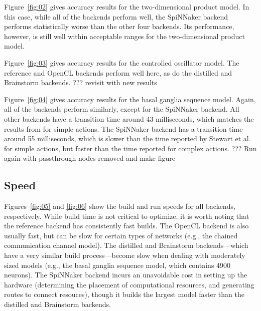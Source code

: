 \documentclass{frontiersSCNS}
\begin{document}
Figure~\ref{fig:02} gives accuracy results
for the two-dimensional product model.
In this case, while all of the backends
perform well, the SpiNNaker backend
performs statistically worse than the
other four backends.
Its performance, however, is still well within
acceptable ranges for the two-dimensional product model.

Figure~\ref{fig:03} gives accuracy results
for the controlled oscillator model.
The reference and OpenCL backends perform well here,
as do the distilled and Brainstorm backends.
??? revisit with new results

Figure~\ref{fig:04} gives accuracy results
for the basal ganglia sequence model.
Again, all of the backends perform similarly,
except for the SpiNNaker backend.
All other backends have a transition time
around 43 milliseconds, which matches
the results from \citeauthor{stewart2010}
for simple actions.
The SpiNNaker backend has a transition time
around 55 milliseconds, which is slower
than the time reported by Stewart et al.
for simple actions, but faster than the
time reported for complex actions.
??? Run again with passthrough nodes removed
and make figure

\subsection{Speed}

Figures~\ref{fig:05} and \ref{fig:06} show
the build and run speeds for all backends, respectively.
While build time is not critical to optimize,
it is worth noting that the reference backend
has consistently fast builds.
The OpenCL backend is also usually fast,
but can be slow for certain types of networks
(e.g., the chained communication channel model).
The distilled and Brainstorm backends---which
have a very similar build process---become
slow when dealing with moderately sized models
(e.g., the basal ganglia sequence model,
which contains 4900 neurons).
The SpiNNaker backend incurs an unavoidable cost
in setting up the hardware
(determining the placement of computational resources,
and generating routes to connect resouces),
though it builds the largest model faster than
the distilled and Brainstorm backends.
\end{document}
